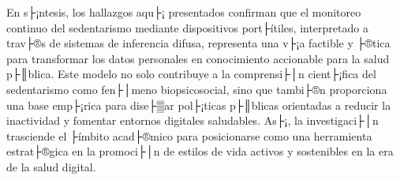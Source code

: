 En s├¡ntesis, los hallazgos aqu├¡ presentados confirman que el monitoreo continuo del sedentarismo mediante dispositivos port├ítiles, interpretado a trav├®s de sistemas de inferencia difusa, representa una v├¡a factible y ├®tica para transformar los datos personales en conocimiento accionable para la salud p├║blica. Este modelo no solo contribuye a la comprensi├│n cient├¡fica del sedentarismo como fen├│meno biopsicosocial, sino que tambi├®n proporciona una base emp├¡rica para dise├▒ar pol├¡ticas p├║blicas orientadas a reducir la inactividad y fomentar entornos digitales saludables. As├¡, la investigaci├│n trasciende el ├ímbito acad├®mico para posicionarse como una herramienta estrat├®gica en la promoci├│n de estilos de vida activos y sostenibles en la era de la salud digital.


